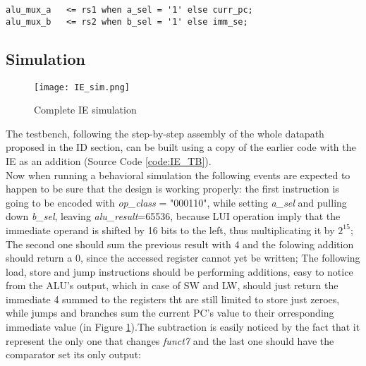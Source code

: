 \begin{verbatim}
alu_mux_a   <= rs1 when a_sel = '1' else curr_pc;
alu_mux_b   <= rs2 when b_sel = '1' else imm_se;
\end{verbatim}

\subsection{Simulation}

\begin{figure}[ht]
    \centering
    \texttt{[image: IE\_sim.png]}
    \caption{Complete IE simulation}
    \label{fig:IE_sim}
\end{figure}

The testbench, following the step-by-step assembly of the whole datapath proposed in the ID section, can be built using a copy of the earlier code with the IE as an addition (Source Code \ref{code:IE_TB}).\\
Now when running a behavioral simulation the following events are expected to happen to be sure that the design is working properly: the first instruction is going to be encoded with \emph{op{\_}class} = "000110", while setting \emph{a{\_}sel} and pulling down \emph{b{\_}sel}, leaving \emph{alu{\_}result}=65536, because LUI operation imply that the immediate operand is shifted by 16 bits to the left, thus multiplicating it by $2^{15}$; The second one should sum the previous result with 4 and the folowing addition should return a 0, since the accessed register cannot yet be written; The following load, store and jump instructions should be performing additions, easy to notice from the ALU's output, which in case of SW and LW, should just return the immediate 4 summed to the registers tht are still limited to store just zeroes, while jumps and branches sum the current PC's value to their orresponding immediate value (in Figure \ref{fig:IE_sim}).The subtraction is easily noticed by the fact that it represent the only one that changes \emph{funct7} and the last one should have the comparator set its only output:\\

